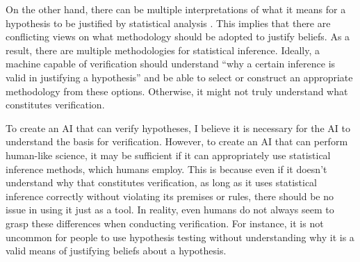 On the other hand, there can be multiple interpretations of what it means for a hypothesis to be justified by statistical analysis \cite{otsuka2022thinking}. This implies that there are conflicting views on what methodology should be adopted to justify beliefs. As a result, there are multiple methodologies for statistical inference. Ideally, a machine capable of verification should understand ``why a certain inference is valid in justifying a hypothesis''  and be able to select or construct an appropriate methodology from these options. Otherwise, it might not truly understand what constitutes verification.

To create an AI that can verify hypotheses, I believe it is necessary for the AI to understand the basis for verification. However, to create an AI that can perform human-like science, it may be sufficient if it can appropriately use statistical inference methods, which humans employ. This is because even if it doesn't understand why that constitutes verification, as long as it uses statistical inference correctly without violating its premises or rules, there should be no issue in using it just as a tool. In reality, even humans do not always seem to grasp these differences when conducting verification. For instance, it is not uncommon for people to use hypothesis testing without understanding why it is a valid means of justifying beliefs about a hypothesis. 



